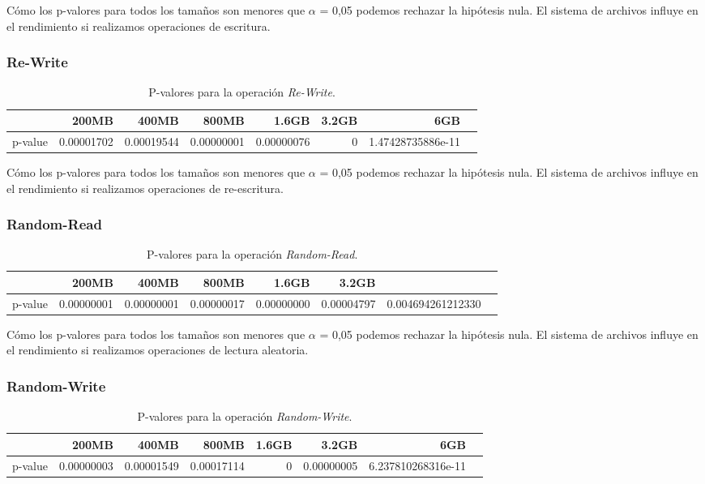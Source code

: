 Cómo los p-valores para todos los tamaños son menores que $\alpha$ = 0,05 podemos rechazar la hipótesis nula. El sistema de archivos influye en el rendimiento si realizamos operaciones de escritura. 
\newpage
\subsubsection{Re-Write}
\begin{table}[!htp]\centering
\scriptsize
\begin{tabular}{lrrrrrrr}\toprule
&200MB &400MB &800MB &1.6GB &3.2GB &6GB \\\midrule
p-value &0.00001702 &0.00019544 &0.00000001 &0.00000076 &0 &1.47428735886e-11 \\
\bottomrule
\end{tabular}
\caption{P-valores para la operación \textit{Re-Write}.}\label{tab: }
\end{table}

Cómo los p-valores para todos los tamaños son menores que $\alpha$ = 0,05 podemos rechazar la hipótesis nula. El sistema de archivos influye en el rendimiento si realizamos operaciones de re-escritura. 

\subsubsection{Random-Read}
\begin{table}[!htp]\centering
\scriptsize
\begin{tabular}{lrrrrrrr}\toprule
&200MB &400MB &800MB &1.6GB &3.2GB \\\midrule
p-value &0.00000001 &0.00000001 &0.00000017 &0.00000000 &0.00004797 &0.004694261212330 \\
\bottomrule
\end{tabular}
\caption{P-valores para la operación \textit{Random-Read}.}\label{tab: }
\end{table}

Cómo los p-valores para todos los tamaños son menores que $\alpha$ = 0,05 podemos rechazar la hipótesis nula. El sistema de archivos influye en el rendimiento si realizamos operaciones de lectura aleatoria. 

\subsubsection{Random-Write}
\begin{table}[!htp]\centering
\scriptsize
\begin{tabular}{lrrrrrrr}\toprule
&200MB &400MB &800MB &1.6GB &3.2GB &6GB \\\midrule
p-value &0.00000003 &0.00001549 &0.00017114 &0 &0.00000005 &6.237810268316e-11 \\
\bottomrule
\end{tabular}
\caption{P-valores para la operación \textit{Random-Write}.}\label{tab: }
\end{table}

